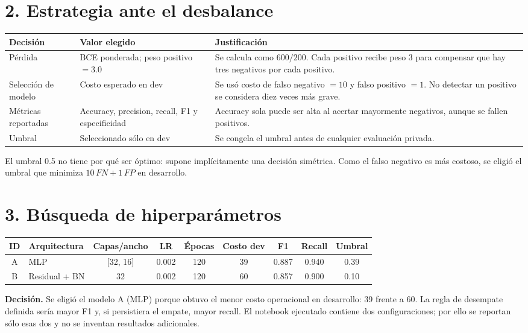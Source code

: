 \documentclass[10pt]{article}
\begin{document}
\section*{2. Estrategia ante el desbalance}
\begin{tabular}{@{}p{3.0cm}p{4.0cm}p{6.7cm}@{}}
\toprule
Decisión & Valor elegido & Justificación\\
\midrule
Pérdida & BCE ponderada; peso positivo $=3.0$ & Se calcula como $600/200$. Cada positivo recibe peso 3 para compensar que hay tres negativos por cada positivo.\\
Selección de modelo & Costo esperado en dev & Se usó costo de falso negativo $=10$ y falso positivo $=1$. No detectar un positivo se considera diez veces más grave.\\
Métricas reportadas & Accuracy, precision, recall, F1 y especificidad & Accuracy sola puede ser alta al acertar mayormente negativos, aunque se fallen positivos.\\
Umbral & Seleccionado sólo en dev & Se congela el umbral antes de cualquier evaluación privada.\\
\bottomrule
\end{tabular}

\vspace{0.6em}
El umbral 0.5 no tiene por qué ser óptimo: supone implícitamente una decisión simétrica. Como el falso negativo es más costoso, se eligió el umbral que minimiza $10\,FN + 1\,FP$ en desarrollo.

\section*{3. Búsqueda de hiperparámetros}
\small
\begin{tabular}{@{}clccccccc@{}}
\toprule
ID & Arquitectura & Capas/ancho & LR & Épocas & Costo dev & F1 & Recall & Umbral\\
\midrule
A & MLP & [32, 16] & 0.002 & 120 & 39 & 0.887 & 0.940 & 0.39\\
B & Residual + BN & 32 & 0.002 & 120 & 60 & 0.857 & 0.900 & 0.10\\
\bottomrule
\end{tabular}
\normalsize

\vspace{0.5em}
\textbf{Decisión.} Se eligió el modelo A (MLP) porque obtuvo el menor costo operacional en desarrollo: 39 frente a 60. La regla de desempate definida sería mayor F1 y, si persistiera el empate, mayor recall. El notebook ejecutado contiene dos configuraciones; por ello se reportan sólo esas dos y no se inventan resultados adicionales.
\end{document}
